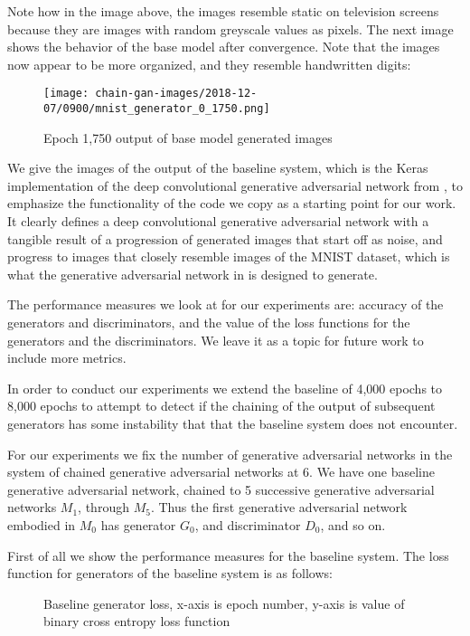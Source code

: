 \documentclass[conference]{IEEEtran}
\begin{document}
Note how in the image above, the images resemble static on television screens
because they are images with random greyscale values as pixels.  The next image
shows the behavior of the base model after convergence. Note that the images now
appear to be more organized, and they resemble handwritten digits:
 \begin{figure}[htbp]
\centerline{\texttt{[image: chain-gan-images/2018-12-07/0900/mnist\_generator\_0\_1750.png]}}
\caption{Epoch 1,750 output of base model generated images}
\label{trainedBaseGan}
\end{figure}


We give the images of the output of the baseline system, which is the Keras
implementation of the deep convolutional generative adversarial network from
\cite{kerasdcgan}, to emphasize the functionality of the code we copy as a
starting point for our work.  It clearly defines a deep convolutional generative
adversarial network with a tangible result of a progression of generated images
that start off as noise, and progress to images that closely resemble images of
the MNIST dataset, which is what the generative adversarial network in
\cite{kerasdcgan} is designed to generate.  

The performance measures we look at for our experiments are: accuracy of the
generators and discriminators, and the value of the loss functions for the
generators and the discriminators.  We leave it as a topic for future work to
include more metrics.

In order to conduct our experiments we extend the baseline of 4,000 epochs to
8,000 epochs to attempt to detect if the chaining of the output of subsequent
generators has some instability that that the baseline system does not
encounter.

For our experiments we fix the number of generative adversarial networks in the 
system of chained generative adversarial networks at 6.  We have one baseline 
generative adversarial network, chained to 5 successive generative adversarial
networks $M_{1}$, through $M_{5}$.  Thus the first generative adversarial
network embodied in $M_{0}$ has generator $G_{0}$, and discriminator $D_{0}$,
and so on.

First of all we show the performance measures for the baseline system.  The
loss function for generators of the baseline system is as follows:

\begin{figure}[htpb]
\caption{Baseline generator loss, x-axis is epoch number, y-axis is 
value of binary cross entropy loss function }
\label{gen0Loss}
\end{figure}
\end{document}
